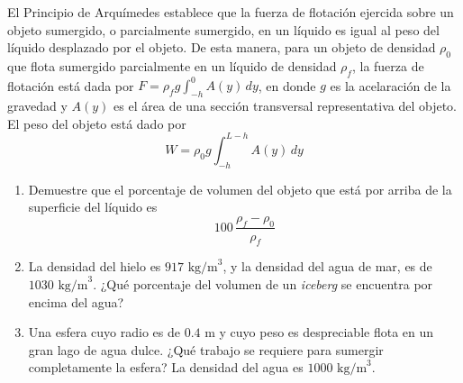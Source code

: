 \item El Principio de Arquímedes establece que la fuerza de flotación ejercida sobre un objeto sumergido, o parcialmente sumergido, en un líquido es igual al peso del líquido desplazado por el objeto. De esta manera, para un objeto de densidad $\rho_0$ que flota sumergido parcialmente en un líquido de densidad $\rho_f$, la fuerza de flotación está dada por $F = \rho_f g \int_{-h}^0 A(y) \, dy$, en donde $g$ es la acelaración de la gravedad y $A(y)$ es el área de una sección transversal representativa del objeto. El peso del objeto está dado por
$$W = \rho_0 g \int_{-h}^{L-h} A(y) \, dy$$
\begin{enumerate}
    \item[(a)] Demuestre que el porcentaje de volumen del objeto que está por arriba de la superficie del líquido es
    $$100 \, \frac{\rho_f - \rho_0}{\rho_f}$$
    \item[(b)] La densidad del hielo es $917 \text{ kg/m}^3$, y la densidad del agua de mar, es de $1030 \text{ kg/m}^3$. ¿Qué porcentaje del volumen de un \textit{iceberg} se encuentra por encima del agua?
    \item[(c)] Una esfera cuyo radio es de $0.4 \text{ m}$ y cuyo peso es despreciable flota en un gran lago de agua dulce. ¿Qué trabajo se requiere para sumergir completamente la esfera? La densidad del agua es $1000 \text{ kg/m}^3$.
\end{enumerate}
\begin{center}
\end{center}
